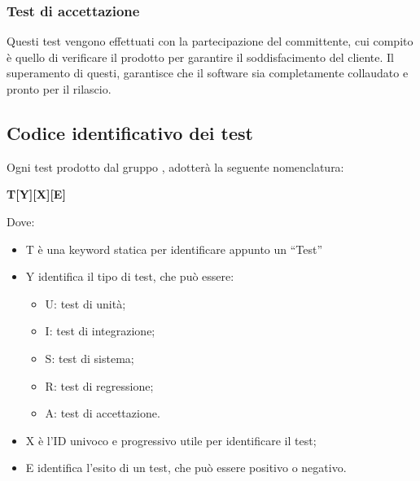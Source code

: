 \subsubsection{Test di accettazione}
Questi test vengono effettuati con la partecipazione del committente, cui compito è quello di verificare il prodotto per garantire il soddisfacimento del cliente. Il superamento di questi, garantisce che il software sia completamente collaudato e pronto per il rilascio.

\subsection{Codice identificativo dei test}
Ogni test prodotto dal gruppo {\Gruppo}, adotterà la seguente nomenclatura:
\begin{center} \textbf{T[Y][X][E]} \end{center}
Dove:
\begin{itemize}
	\item T è una keyword statica per identificare appunto un “Test”
	\item Y identifica il tipo di test, che può essere:
		\begin{itemize}
			\item U: test di unità;
			\item I: test di integrazione;
			\item S: test di sistema;
			\item R: test di regressione;
			\item A: test di accettazione.
		\end{itemize}
		\item X è l'ID univoco e progressivo utile per identificare il test;
		\item E identifica l'esito di un test, che può essere positivo o negativo.
\end{itemize}
